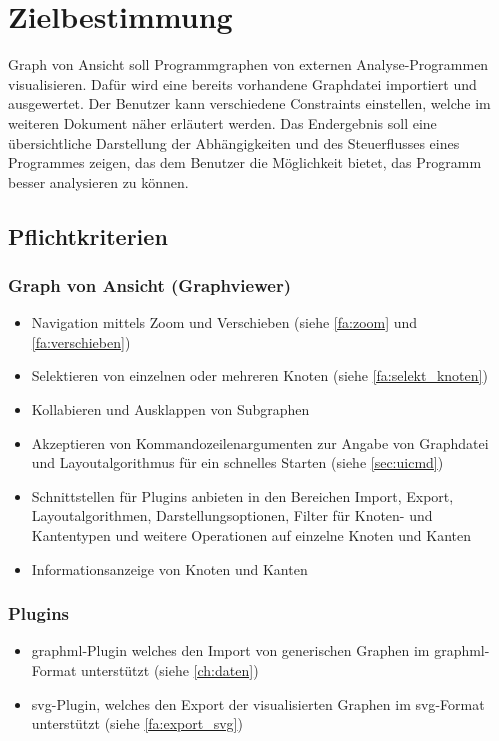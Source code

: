 \chapter{Zielbestimmung}

Graph von Ansicht soll Programmgraphen von externen Analyse-Programmen visualisieren. Dafür wird eine bereits vorhandene Graphdatei importiert und ausgewertet. Der Benutzer kann verschiedene Constraints einstellen, welche im weiteren Dokument näher erläutert werden.
Das Endergebnis soll eine übersichtliche Darstellung der Abhängigkeiten und des Steuerflusses eines Programmes zeigen, das dem Benutzer die Möglichkeit bietet, das Programm besser analysieren zu können.

\section{Pflichtkriterien}

\subsection{Graph von Ansicht (Graphviewer)}
  \begin{itemize}
    \item Navigation mittels Zoom und Verschieben (siehe \ref{fa:zoom} und \ref{fa:verschieben})
    \item Selektieren von einzelnen oder mehreren Knoten (siehe \ref{fa:selekt_knoten})
    \item Kollabieren und Ausklappen von \gls{Subgraph}en %
    \item Akzeptieren von Kommandozeilenargumenten zur Angabe von Graphdatei und Layoutalgorithmus für ein schnelles Starten (siehe \ref{sec:uicmd})
    \item Schnittstellen für Plugins anbieten in den Bereichen Import, Export, Layoutalgorithmen, Darstellungsoptionen, Filter für Knoten- und Kantentypen und weitere Operationen auf einzelne Knoten und Kanten
    \item Informationsanzeige von Knoten und Kanten
  \end{itemize}
  
\subsection{Plugins}
  \begin{itemize}
    \item \gls{graphml}-Plugin welches den Import von generischen Graphen im \gls{graphml}-Format unterstützt (siehe \ref{ch:daten})
    \item \gls{svg}-Plugin, welches den Export der visualisierten Graphen im \gls{svg}-Format unterstützt (siehe \ref{fa:export_svg})
  \end{itemize}
  

